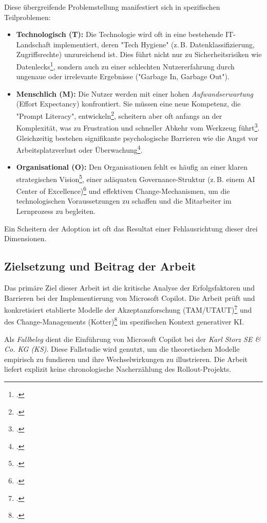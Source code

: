 \documentclass[12pt,a4paper,oneside]{article} %
\begin{document}
Diese übergreifende Problemstellung manifestiert sich in spezifischen Teilproblemen:
\begin{itemize}
    \item \textbf{Technologisch (T):} Die Technologie wird oft in eine bestehende IT-Landschaft implementiert, deren "Tech Hygiene" (z.\,B. Datenklassifizierung, Zugriffsrechte) unzureichend ist. Dies führt nicht nur zu Sicherheitsrisiken wie Datenlecks\footcite{MicrosoftLearn2025CopilotSecurity}, sondern auch zu einer schlechten Nutzererfahrung durch ungenaue oder irrelevante Ergebnisse ("Garbage In, Garbage Out").
    \item \textbf{Menschlich (M):} Die Nutzer werden mit einer hohen \textit{Aufwandserwartung} (Effort Expectancy) konfrontiert. Sie müssen eine neue Kompetenz, die "Prompt Literacy", entwickeln\footcite{Monash2025PromptLiteracy}, scheitern aber oft anfangs an der Komplexität, was zu Frustration und schneller Abkehr vom Werkzeug führt\footcite{Arxiv2025BeyondTraining}. Gleichzeitig bestehen signifikante psychologische Barrieren wie die Angst vor Arbeitsplatzverlust oder Überwachung\footcite{CyberSecurityIntel2025EmployeeResistance}.
    \item \textbf{Organisational (O):} Den Organisationen fehlt es häufig an einer klaren strategischen Vision\footcite{Prosci2025KotterTheory}, einer adäquaten Governance-Struktur (z.\,B. einem AI Center of Excellence)\footcite{Dataiku2025CoEBestPractices} und effektiven Change-Mechanismen, um die technologischen Voraussetzungen zu schaffen und die Mitarbeiter im Lernprozess zu begleiten.
\end{itemize}
Ein Scheitern der Adoption ist oft das Resultat einer Fehlausrichtung dieser drei Dimensionen.

\subsection{Zielsetzung und Beitrag der Arbeit}
Das primäre Ziel dieser Arbeit ist die kritische Analyse der Erfolgsfaktoren und Barrieren bei der Implementierung von Microsoft Copilot. Die Arbeit prüft und konkretisiert etablierte Modelle der Akzeptanzforschung (TAM/UTAUT)\footcite{UTAUT2_Students_Cedtech2025} und des Change-Managements (Kotter)\footcite{Prosci2025KotterTheory} im spezifischen Kontext generativer KI.

Als \textit{Fallbeleg} dient die Einführung von Microsoft Copilot bei der \emph{Karl Storz SE \& Co. KG (KS)}. Diese Fallstudie wird genutzt, um die theoretischen Modelle empirisch zu fundieren und ihre Wechselwirkungen zu illustrieren. Die Arbeit liefert explizit keine chronologische Nacherzählung des Rollout-Projekts.
\end{document}
